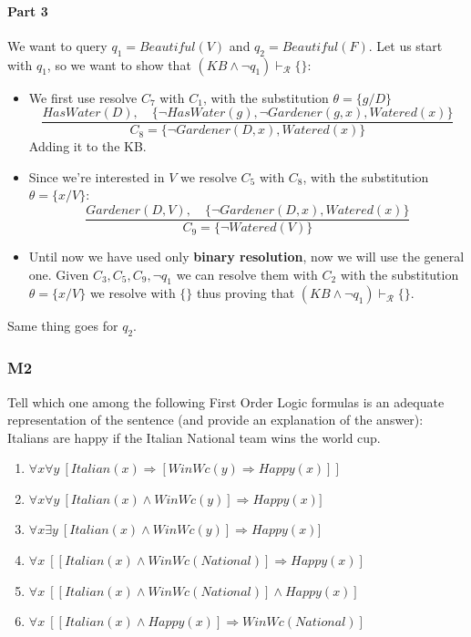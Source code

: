 \documentclass[10pt,a4paper]{article}
\begin{document}
\begin{itemize}
\paragraph{Part 3}
We want to query $q_1=Beautiful(V)$ and $q_2=Beautiful(F)$. Let us start with $q_1$, so we want to show that $(KB \wedge \neg q_1)\vdash_{\mathcal{R}} \{\}$:
\begin{itemize}
\item We first use resolve $C_7$ with $C_1$, with the substitution $\theta=\{g/D\}$
\[\frac{ HasWater(D),\quad \lbrace \neg HasWater(g), \neg Gardener(g,x), Watered(x)\rbrace}{C_8=\lbrace \neg Gardener(D,x), Watered(x)\rbrace}\]
Adding it to the KB.
\item Since we're interested in $V$ we resolve $C_5$  with $C_8$, with the substitution $\theta=\{x/V\}$:
\[\frac{Gardener(D,V),\quad \lbrace \neg Gardener(D,x), Watered(x)\rbrace}{C_9=\lbrace \neg Watered(V)\rbrace}\]
\item Until now we have used only \textbf{binary resolution}, now we will use the general one. Given $C_3,C_5,C_9,\neg q_1$ we can resolve them with $C_2$ with the substitution $\theta=\{x/V\}$ we resolve with $\{\}$ thus proving that $(KB \wedge \neg q_1)\vdash_{\mathcal{R}} \{\}$.
\end{itemize}
Same thing goes for $q_2$.


\subsubsection{M2}
Tell which one among the following First Order Logic formulas is an adequate representation of the sentence (and provide an explanation of the answer):
Italians are happy if the Italian National team wins the world cup.
\begin{enumerate}
\item $\forall x\forall y\ [Italian(x)\Rightarrow [WinWc(y)\Rightarrow Happy(x)]]$
\item $\forall x\forall y\ [Italian(x)\wedge WinWc(y)]\Rightarrow Happy(x)]$
\item $\forall x\exists y\ [Italian(x)\wedge WinWc(y)]\Rightarrow Happy(x)]$
\item $\forall x\ [[Italian(x)\wedge WinWc(National)]\Rightarrow Happy(x)]$
\item $\forall x\ [[Italian(x)\wedge WinWc(National)]\wedge Happy(x)]$
\item $\forall x\ [[Italian(x)\wedge Happy(x)]\Rightarrow  WinWc(National)]$
\end{enumerate}


\end{itemize}
\end{document}
